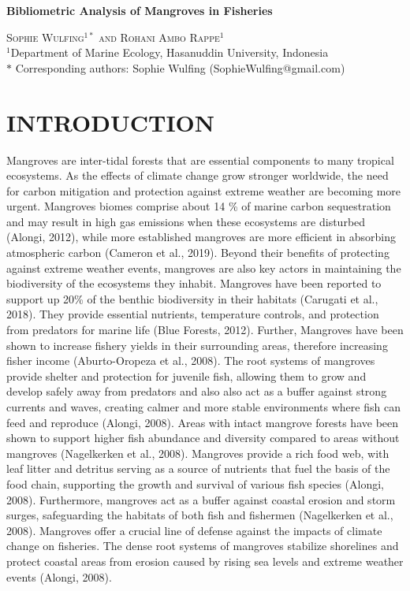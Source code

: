 \documentclass[
  12pt,
]{article}
\author{}
\date{\vspace{-2.5em}}
\begin{document}
\doublespacing

\begin{center}
    
\textbf{\Large Bibliometric Analysis of Mangroves in Fisheries}
    
\textsc{Sophie Wulfing$^{1*}$ and Rohani Ambo Rappe$^{1}$\\}
\vspace{3 mm}
\normalsize{\indent $^1$Department of Marine Ecology, Hasanuddin University, Indonesia\\}
$\text{*}$ Corresponding authors: Sophie Wulfing (SophieWulfing@gmail.com)
\end{center}

\newpage

\hypertarget{introduction}{%
\section{INTRODUCTION}\label{introduction}}

Mangroves are inter-tidal forests that are essential components to many tropical ecosystems. As the effects of climate change grow stronger worldwide, the need for carbon mitigation and protection against extreme weather are becoming more urgent. Mangroves biomes comprise about 14 \% of marine carbon sequestration and may result in high gas emissions when these ecosystems are disturbed (Alongi, 2012), while more established mangroves are more efficient in absorbing atmospheric carbon (Cameron et al., 2019). Beyond their benefits of protecting against extreme weather events, mangroves are also key actors in maintaining the biodiversity of the ecosystems they inhabit. Mangroves have been reported to support up 20\% of the benthic biodiversity in their habitats (Carugati et al., 2018). They provide essential nutrients, temperature controls, and protection from predators for marine life (Blue Forests, 2012). Further, Mangroves have been shown to increase fishery yields in their surrounding areas, therefore increasing fisher income (Aburto-Oropeza et al., 2008). The root systems of mangroves provide shelter and protection for juvenile fish, allowing them to grow and develop safely away from predators and also also act as a buffer against strong currents and waves, creating calmer and more stable environments where fish can feed and reproduce (Alongi, 2008). Areas with intact mangrove forests have been shown to support higher fish abundance and diversity compared to areas without mangroves (Nagelkerken et al., 2008). Mangroves provide a rich food web, with leaf litter and detritus serving as a source of nutrients that fuel the basis of the food chain, supporting the growth and survival of various fish species (Alongi, 2008). Furthermore, mangroves act as a buffer against coastal erosion and storm surges, safeguarding the habitats of both fish and fishermen (Nagelkerken et al., 2008). Mangroves offer a crucial line of defense against the impacts of climate change on fisheries. The dense root systems of mangroves stabilize shorelines and protect coastal areas from erosion caused by rising sea levels and extreme weather events (Alongi, 2008).
\end{document}
